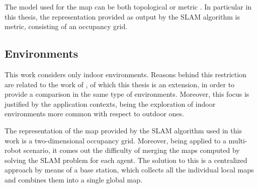 The model used for the map can be both topological \cite{Grisetti2010}
or metric \cite{Montemerlo2002}. In particular in this thesis, the representation
provided as output by the SLAM algorithm is metric, consisting of
an occupancy grid. 

\subsection{Environments}

This work considers only indoor environments. Reasons behind this
restriction are related to the work of \cite{Cattaneo2017}, of which
this thesis is an extension, in order to provide a comparison in the
same type of environments. Moreover, this focus is justified by the
application contexts, being the exploration of indoor environments
more common with respect to outdoor ones.

The representation of the map provided by the SLAM algorithm used
in this work is a two-dimensional occupancy grid. Moreover, being
applied to a multi-robot scenario, it comes out the difficulty of
merging the maps computed by solving the SLAM problem for each agent.
The solution to this is a centralized approach by means of a base
station, which collects all the individual local maps and combines
them into a single global map.

